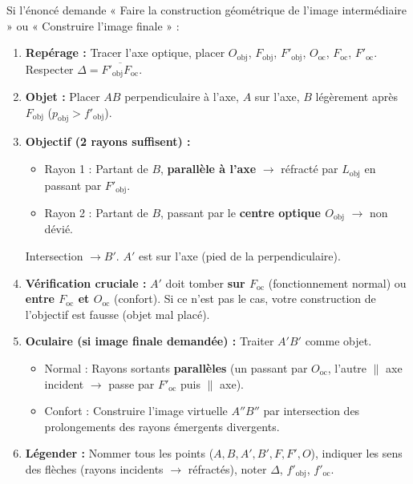 \documentclass[11pt]{article}
\begin{document}
\begin{methode}
Si l'énoncé demande « Faire la construction géométrique de l'image intermédiaire » ou « Construire l'image finale » :
\begin{enumerate}
    \item \textbf{Repérage :} Tracer l'axe optique, placer $O_{\text{obj}}$, $F_{\text{obj}}$, $F'_{\text{obj}}$, $O_{\text{oc}}$, $F_{\text{oc}}$, $F'_{\text{oc}}$. Respecter $\Delta = \overline{F'_{\text{obj}}F_{\text{oc}}}$.
    \item \textbf{Objet :} Placer $AB$ perpendiculaire à l'axe, $A$ sur l'axe, $B$ légèrement après $F_{\text{obj}}$ ($p_{\text{obj}} > f'_{\text{obj}}$).
    \item \textbf{Objectif (2 rayons suffisent) :}
        \begin{itemize}
            \item Rayon 1 : Partant de $B$, \textbf{parallèle à l'axe} $\rightarrow$ réfracté par $L_{\text{obj}}$ en passant par $F'_{\text{obj}}$.
            \item Rayon 2 : Partant de $B$, passant par le \textbf{centre optique $O_{\text{obj}}$} $\rightarrow$ non dévié.
        \end{itemize}
        Intersection $\rightarrow B'$. $A'$ est sur l'axe (pied de la perpendiculaire).
    \item \textbf{Vérification cruciale :} $A'$ doit tomber \textbf{sur $F_{\text{oc}}$} (fonctionnement normal) ou \textbf{entre $F_{\text{oc}}$ et $O_{\text{oc}}$} (confort). Si ce n'est pas le cas, votre construction de l'objectif est fausse (objet mal placé).
    \item \textbf{Oculaire (si image finale demandée) :} Traiter $A'B'$ comme objet.
        \begin{itemize}
            \item Normal : Rayons sortants \textbf{parallèles} (un passant par $O_{\text{oc}}$, l'autre $\parallel$ axe incident $\rightarrow$ passe par $F'_{\text{oc}}$ puis $\parallel$ axe).
            \item Confort : Construire l'image virtuelle $A''B''$ par intersection des prolongements des rayons émergents divergents.
        \end{itemize}
    \item \textbf{Légender :} Nommer tous les points ($A, B, A', B', F, F', O$), indiquer les sens des flèches (rayons incidents $\rightarrow$ réfractés), noter $\Delta$, $f'_{\text{obj}}$, $f'_{\text{oc}}$.
\end{enumerate}
\end{methode}
\end{document}
